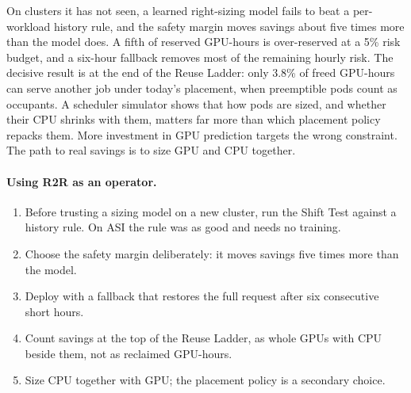 \documentclass[10pt]{article}
\begin{document}
On clusters it has not seen, a learned right-sizing model fails to beat a per-workload history rule, and the safety margin moves savings about five times more than the model does. A fifth of reserved GPU-hours is over-reserved at a 5\% risk budget, and a six-hour fallback removes most of the remaining hourly risk. The decisive result is at the end of the Reuse Ladder: only 3.8\% of freed GPU-hours can serve another job under today's placement, when preemptible pods count as occupants. A scheduler simulator shows that how pods are sized, and whether their CPU shrinks with them, matters far more than which placement policy repacks them. More investment in GPU prediction targets the wrong constraint. The path to real savings is to size GPU and CPU together.

\paragraph{Using R2R as an operator.}
\begin{enumerate}
  \item Before trusting a sizing model on a new cluster, run the Shift Test against a history rule. On ASI the rule was as good and needs no training.
  \item Choose the safety margin deliberately: it moves savings five times more than the model.
  \item Deploy with a fallback that restores the full request after six consecutive short hours.
  \item Count savings at the top of the Reuse Ladder, as whole GPUs with CPU beside them, not as reclaimed GPU-hours.
  \item Size CPU together with GPU; the placement policy is a secondary choice.
\end{enumerate}
\end{document}
